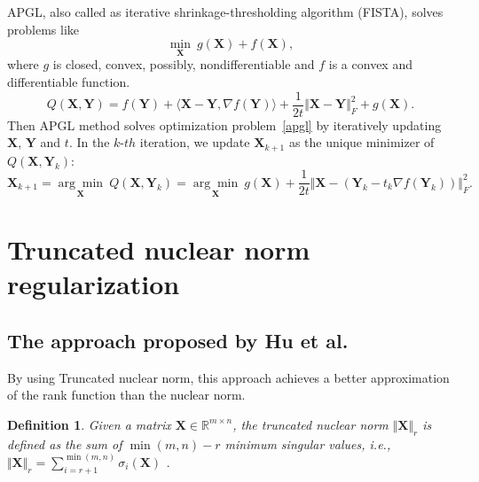 \documentclass[fontset=windows]{article}
\newtheorem{definition}{Definition}[section]
\begin{document}
{APGL, also called as iterative shrinkage-thresholding algorithm (FISTA), solves problems like
\begin{equation}
    \underset{\mathbf X}{\min} \ g(\mathbf X)+f(\mathbf X),
    \label{apgl}
\end{equation}
where $g$ is closed, convex, possibly, nondifferentiable and $f$ is a convex and differentiable function. 
\begin{equation}
    Q(\mathbf X,\mathbf Y) = f(\mathbf Y)+\langle \mathbf X - \mathbf Y, \nabla f(\mathbf Y) \rangle + \frac{1}{2t}\Vert \mathbf X - \mathbf Y \Vert_F^2 +g(\mathbf X).
\end{equation}
Then APGL method solves optimization problem~\eqref{apgl} by iteratively updating $\mathbf X$, $\mathbf Y$ and $t$. In the $k$-$th$ iteration, we update $\mathbf X_{k+1}$ as the unique minimizer of $Q(\mathbf X, \mathbf Y_k)$:
\begin{equation}
    \mathbf X_{k+1} = \underset{\mathbf X}{\arg\min}\ Q(\mathbf X, \mathbf Y_k) = \underset{\mathbf X}{\arg\min}\ g(\mathbf X)+\frac{1}{2t}\Vert \mathbf X- (\mathbf Y_k -t_k \nabla f(\mathbf Y_k))\Vert_F^2.
\end{equation}


\section{Truncated nuclear norm regularization}
\label{s3}

\subsection{The approach proposed by Hu et al.}
By using Truncated nuclear norm, this approach achieves a better approximation of the rank function than the nuclear norm.
\begin{definition}
    Given a matrix $\mathbf X \in \mathbb{R}^{m \times n}$, the truncated nuclear norm $\Vert\mathbf X \Vert_r$ is defined as the sum of $\min(m,n) - r$  minimum singular values, i.e., $\Vert\mathbf X \Vert_r = \sum_{i=r+1}^{\min(m,n)} \sigma_i(\mathbf X)$ .
\end{definition}

}
\end{document}
